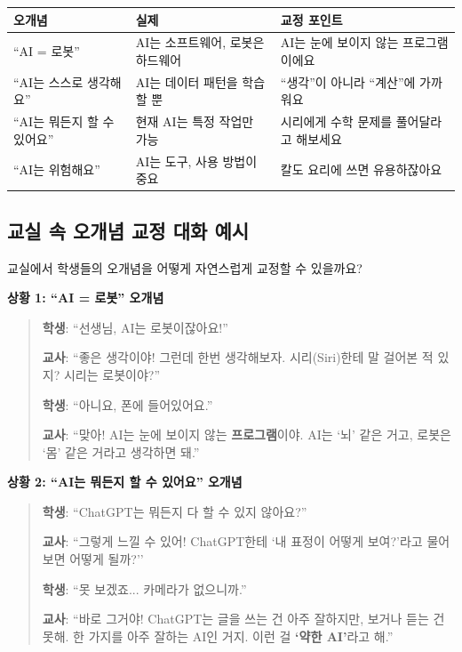 \documentclass[11pt,a4paper]{article}
\begin{document}
\begin{center}
\begin{tabular}{|p{3.5cm}|p{4.5cm}|p{5cm}|}
\hline
\rowcolor{tableheader}
\textbf{오개념} & \textbf{실제} & \textbf{교정 포인트} \\
\hline
``AI = 로봇'' & AI는 소프트웨어, 로봇은 하드웨어 & AI는 눈에 보이지 않는 프로그램이에요 \\
\hline
``AI는 스스로 생각해요'' & AI는 데이터 패턴을 학습할 뿐 & ``생각''이 아니라 ``계산''에 가까워요 \\
\hline
``AI는 뭐든지 할 수 있어요'' & 현재 AI는 특정 작업만 가능 & 시리에게 수학 문제를 풀어달라고 해보세요 \\
\hline
``AI는 위험해요'' & AI는 도구, 사용 방법이 중요 & 칼도 요리에 쓰면 유용하잖아요 \\
\hline
\end{tabular}
\end{center}

\subsection{교실 속 오개념 교정 대화 예시}

교실에서 학생들의 오개념을 어떻게 자연스럽게 교정할 수 있을까요?

\textbf{상황 1: ``AI = 로봇'' 오개념}

\begin{quote}
 \textbf{학생}: ``선생님, AI는 로봇이잖아요!''

 \textbf{교사}: ``좋은 생각이야! 그런데 한번 생각해보자. 시리(Siri)한테 말 걸어본 적 있지? 시리는 로봇이야?''

 \textbf{학생}: ``아니요, 폰에 들어있어요.''

 \textbf{교사}: ``맞아! AI는 눈에 보이지 않는 \textbf{프로그램}이야. AI는 `뇌' 같은 거고, 로봇은 `몸' 같은 거라고 생각하면 돼.''
\end{quote}

\textbf{상황 2: ``AI는 뭐든지 할 수 있어요'' 오개념}

\begin{quote}
 \textbf{학생}: ``ChatGPT는 뭐든지 다 할 수 있지 않아요?''

 \textbf{교사}: ``그렇게 느낄 수 있어! ChatGPT한테 `내 표정이 어떻게 보여?'라고 물어보면 어떻게 될까?''

 \textbf{학생}: ``못 보겠죠... 카메라가 없으니까.''

 \textbf{교사}: ``바로 그거야! ChatGPT는 글을 쓰는 건 아주 잘하지만, 보거나 듣는 건 못해. 한 가지를 아주 잘하는 AI인 거지. 이런 걸 \textbf{`약한 AI'}라고 해.''
\end{quote}
\end{document}
